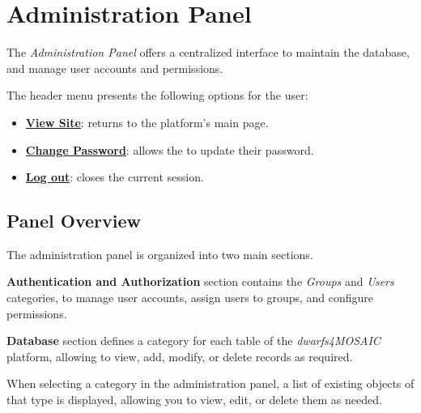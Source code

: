 
\chapter{Administration Panel} \label{chap:admin-panel}

The \textsl{Administration Panel} offers a centralized interface to maintain the database, and manage user accounts and permissions. 

The header menu presents the following options for the \admin user:

\begin{itemize}
	\item \textbf{\hyperref[chap:admin-homepage]{View Site}}: returns to the platform’s main page.
	\item \textbf{\hyperref[chap:admin-change-password]{Change Password}}: allows the \admin to update their password.
	\item \textbf{\hyperref[chap:admin-logout]{Log out}}: closes the current session.
\end{itemize}



\section{Panel Overview} \label{sec:admin-panel-overview}

The administration panel is organized into two main sections.

\textbf{Authentication and Authorization} section contains the \textsl{Groups} and \textsl{Users} categories, to manage user accounts, assign users to groups, and configure permissions.
	
	
\textbf{Database} section defines a category for each table of the \textsl{dwarfs4MOSAIC} platform, allowing to view, add, modify, or delete records as required.
	
	

When selecting a category in the administration panel, a list of existing objects of that type is displayed, allowing you to view, edit, or delete them as needed.


